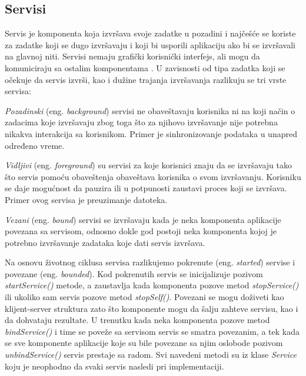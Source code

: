 \documentclass[android.tex]{subfiles}
\begin{document}
\subsection{Servisi}
Servis je komponenta koja izvršava svoje zadatke u pozadini i najčešće se koriste za zadatke koji se dugo izvršavaju i koji bi usporili aplikaciju ako bi se izvršavali na glavnoj niti. Servisi nemaju grafički korisnički interfejs, ali mogu da komuniciraju sa ostalim komponentama \cite{book:hellman}. U zavisnosti od tipa zadatka koji se očekuje da servis izvrši, kao i dužine trajanja izvršavanja razlikuju se tri vrste servisa:
\begin{description}
    \item \textit{Pozadinski} (eng. \textit{background}) servisi ne obaveštavaju korisnika ni na koji način o zadacima koje izvršavaju zbog toga što za njihovo izvršavanje nije potrebna nikakva interakcija sa korisnikom. Primer je sinhronizovanje podataka u unapred određeno vreme.  
    \item \textit{Vidljivi} (eng. \textit{foreground}) su servisi za koje korisnici znaju da se izvršavaju tako što servis pomoću obaveštenja obaveštava korisnika o svom izvršavanju. Korisniku se daje mogućnost da pauzira ili u potpunosti zaustavi proces koji se izvršava. Primer ovog servisa je preuzimanje datoteka.
    \item \textit{Vezani} (eng. \textit{bound}) servisi se izvršavaju kada je neka komponenta aplikacije povezana sa servisom, odnosno dokle god postoji neka komponenta kojoj je potrebno izvršavanje zadataka koje dati servis izvršava.
\end{description}

Na osnovu životnog ciklusa servisa razlikujemo pokrenute (eng. \textit{started}) servise i povezane (eng. \textit{bounded}). Kod pokrenutih servis se inicijalizuje pozivom \textit{startService()} metode, a zaustavlja kada komponenta pozove metod \textit{stopService() }ili ukoliko sam servis pozove metod \textit{stopSelf()}. Povezani se mogu doživeti kao klijent-server struktura zato što komponente mogu da šalju zahteve servisu, kao i da dohvataju rezultate. U trenutku kada neka komponenta pozove metod \textit{bindService()} i time se poveže sa servisom servis se smatra povezanim, a tek kada se sve komponente aplikacije koje su bile povezane sa njim oslobode pozivom \textit{unbindService()} servis prestaje sa radom. Svi navedeni metodi su iz klase \textit{Service} koju je neophodno da svaki servis nasledi pri implementaciji.
\end{document}
